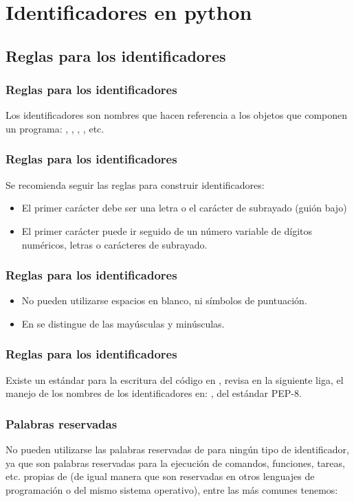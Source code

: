 \documentclass[12pt]{beamer}
\begin{document}
\section{Identificadores en python}
\subsection{Reglas para los identificadores}

\begin{frame}
\frametitle{Reglas para los identificadores}
Los identificadores son nombres que hacen referencia a los objetos que componen un programa: , , , ,  etc.
\end{frame}
\begin{frame}
\frametitle{Reglas para los identificadores}
Se recomienda seguir las reglas para construir identificadores:
\begin{itemize}[<+->]
\item[\ding{212}] El primer carácter debe ser una letra o el carácter de subrayado (guión bajo)
\item[\ding{212}] El primer carácter puede ir seguido de un número variable de dígitos numéricos, letras o carácteres de subrayado.
\end{itemize}
\end{frame}
\begin{frame}
\frametitle{Reglas para los identificadores}
\begin{itemize}[<+->]
\item[\ding{212}] No pueden utilizarse espacios en blanco, ni símbolos de puntuación.
\item[\ding{212}] En \python{} se distingue de las mayúsculas y minúsculas.
\end{itemize}
\end{frame}
\begin{frame}
\frametitle{Reglas para los identificadores}
Existe un estándar para la escritura del código en \python, revisa en la siguiente liga, el manejo de los nombres de los identificadores en: \href{shorturl.at/fOUV7}{}, del estándar PEP-8.
\end{frame}
\begin{frame}
\frametitle{Palabras reservadas}
No pueden utilizarse las palabras reservadas de \python{} para ningún tipo de identificador, \pause ya que son palabras reservadas para la ejecución de comandos, funciones, tareas, etc. propias de \python{} (de igual manera que son reservadas en otros lenguajes de programación o del mismo sistema operativo), entre las más comunes tenemos:
\end{frame}
\end{document}
